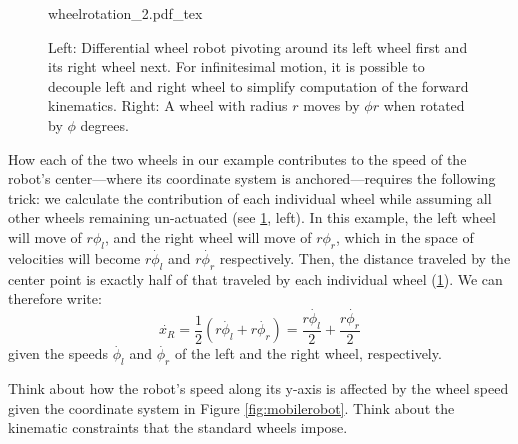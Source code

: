 \begin{figure}[htb!]
    \centering
    \def\svgwidth{\textwidth}
    {wheelrotation_2.pdf_tex}
    \caption{Left: Differential wheel robot pivoting around its left wheel first and its right wheel next. For infinitesimal motion, it is possible to decouple left and right wheel to simplify computation of the forward kinematics. Right: A wheel with radius $r$ moves by $\phi r$ when rotated by $\phi$ degrees.}
    \label{fig:wheelrotation}
\end{figure}

How each of the two wheels in our example contributes to the speed of the robot's center---where its coordinate system is anchored---requires the following trick: we calculate the contribution of each individual wheel while assuming all other wheels remaining un-actuated (see \cref{fig:wheelrotation}, left).
In this example, the left wheel will move of $r \phi_l$, and the right wheel will move of $r \phi_r$, which in the space of velocities will become $r\dot{\phi_l}$ and $r\dot{\phi_r}$ respectively.
Then, the distance traveled by the center point is exactly half of that traveled by each individual wheel (\cref{fig:wheelrotation}). We can therefore write:
\begin{equation}
\dot{x_R}=\frac{1}{2}\left( r\dot{\phi_l} + r\dot{\phi_r} \right)=\frac{r\dot{\phi_l}}{2}+\frac{r\dot{\phi_r}}{2}
\end{equation}
given the speeds $ \dot{\phi_l}$ and $ \dot{\phi_r}$ of the left and the right wheel, respectively.

\begin{mdframed}
Think about how the robot's speed along its y-axis is affected by the wheel speed given the coordinate system in Figure \ref{fig:mobilerobot}. Think about the kinematic constraints that the standard wheels impose.
\end{mdframed}

